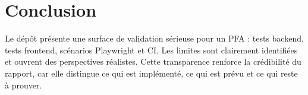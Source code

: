 \section*{Conclusion}
Le dépôt présente une surface de validation sérieuse pour un PFA : tests backend, tests frontend, scénarios Playwright et CI. Les limites sont clairement identifiées et ouvrent des perspectives réalistes. Cette transparence renforce la crédibilité du rapport, car elle distingue ce qui est implémenté, ce qui est prévu et ce qui reste à prouver.
